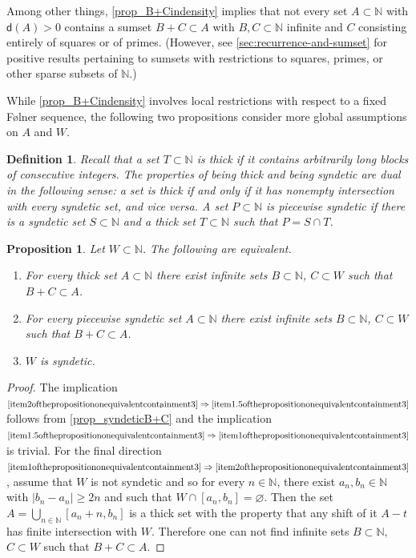\documentclass[10pt,dvipsnames]{article}
\newtheorem{proposition}[theorem]{Proposition}
\newtheorem{definition}[theorem]{Definition}
\theoremstyle{definition}
\theoremstyle{plain}
\newcommand{\define}[1]{\textit{#1}}
\newcommand{\N}{\mathbb{N}}
\newcommand{\dens}{\mathsf{d}}
\renewcommand{\emptyset}{\varnothing}
\newcommand{\Folner}{F\o{}lner}
\begin{document}
Among other things, \cref{prop_B+Cindensity} implies that not every set $A\subset\N$ with $\dens(A)>0$ contains a sumset $B+C\subset A$ with $B,C\subset\N$ infinite and $C$ consisting entirely of squares or of primes. 
(However, see \cref{sec:recurrence-and-sumset} for positive results pertaining to sumsets with restrictions to squares, primes, or other sparse subsets of $\N$.)

While \cref{prop_B+Cindensity} involves local restrictions with respect to a fixed \Folner{} sequence, the following two propositions consider more global assumptions on $A$ and $W$.

\begin{definition}
\label{def:thick_synd_ps}
Recall that a set $T\subset\N$ is \define{thick} if it contains arbitrarily long blocks of consecutive integers.
The properties of being thick and being syndetic are dual in the following sense: a set is thick if and only if it has nonempty intersection with every syndetic set, and vice versa.
A set $P \subset \N$ is \define{piecewise syndetic} if there is a syndetic set $S \subset \N$ and a thick set $T \subset \N$ such that $P = S \cap T$.
\end{definition}

\begin{proposition}
\label{prop:thick_C_repository}
Let $W\subset\N$. 
The following are equivalent.
\begin{enumerate}
\item
\label{item1ofthepropositiononequivalentcontainment3}
For every thick set $A\subset\N$ there exist infinite sets $B\subset\N$, $C\subset W$ such that $B+C\subset A$.
\item
\label{item1.5ofthepropositiononequivalentcontainment3}
For every piecewise syndetic set $A\subset\N$ there exist infinite sets $B\subset\N$, $C\subset W$ such that $B+C\subset A$.
\item
\label{item2ofthepropositiononequivalentcontainment3}
$W$ is syndetic.
\end{enumerate}
\end{proposition}
\begin{proof}
The implication
$
\eqref{item2ofthepropositiononequivalentcontainment3}
\Rightarrow
\eqref{item1.5ofthepropositiononequivalentcontainment3}
$
follows from \cref{prop_syndeticB+C} and the implication $
\eqref{item1.5ofthepropositiononequivalentcontainment3}
\Rightarrow
\eqref{item1ofthepropositiononequivalentcontainment3}
$ is trivial.
For the final direction $
\eqref{item1ofthepropositiononequivalentcontainment3}
\Rightarrow
\eqref{item2ofthepropositiononequivalentcontainment3}
$, assume that $W$ is not syndetic and so for every $n\in\N$, there exist $a_n,b_n\in\N$ with $|b_n-a_n|\geq 2n$ and such that $W\cap [a_n,b_n]=\emptyset$. Then the set  $A=\bigcup_{n\in\N} [a_{n}+n,b_{n}]$ is a thick set with the property that any shift of it $A-t$ has finite intersection with $W$. Therefore one can not find  infinite sets $B\subset\N$, $C\subset W$ such that $B+C\subset A$.
\end{proof}
\end{document}
